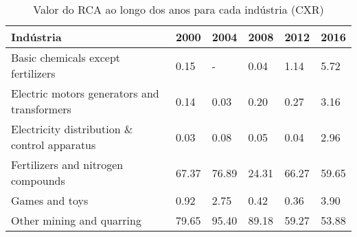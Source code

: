 \begin{table}
\centering
\caption{Valor do RCA ao longo dos anos para cada indústria (CXR)}
\begin{tabular}{p{6cm}p{1.5cm}p{1.5cm}p{1.5cm}p{1.5cm}p{1.5cm}}
\toprule
                                   Indústria &  2000 &  2004 &  2008 &  2012 &  2016 \\
\midrule
          Basic chemicals except fertilizers &  0.15 &     - &  0.04 &  1.14 &  5.72 \\
 Electric motors generators and transformers &  0.14 &  0.03 &  0.20 &  0.27 &  3.16 \\
Electricity distribution \& control apparatus &  0.03 &  0.08 &  0.05 &  0.04 &  2.96 \\
          Fertilizers and nitrogen compounds & 67.37 & 76.89 & 24.31 & 66.27 & 59.65 \\
                              Games and toys &  0.92 &  2.75 &  0.42 &  0.36 &  3.90 \\
                   Other mining and quarring & 79.65 & 95.40 & 89.18 & 59.27 & 53.88 \\
\bottomrule
\end{tabular}
\end{table}
